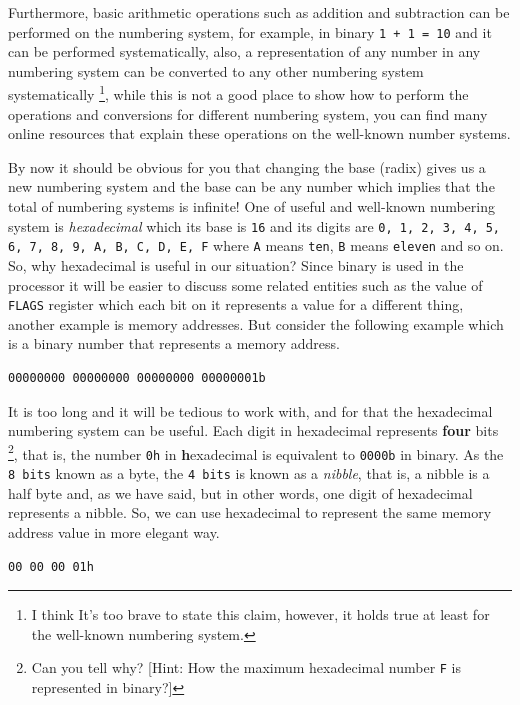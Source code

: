 Furthermore, basic arithmetic operations such as addition and
subtraction can be performed on the numbering system, for example, in
binary \lstinline!1 + 1 = 10! and it can be performed systematically,
also, a representation of any number in any numbering system can be
converted to any other numbering system systematically \footnote{I think
  It's too brave to state this claim, however, it holds true at least
  for the well-known numbering system.}, while this is not a good place
to show how to perform the operations and conversions for different
numbering system, you can find many online resources that explain these
operations on the well-known number systems.

By now it should be obvious for you that changing the base (radix) gives
us a new numbering system and the base can be any number which implies
that the total of numbering systems is infinite! One of useful and
well-known numbering system is \emph{hexadecimal} which its base is
\lstinline!16! and its digits are
\lstinline!0, 1, 2, 3, 4, 5, 6, 7, 8, 9, A, B, C, D, E, F! where
\lstinline!A! means \lstinline!ten!, \lstinline!B! means
\lstinline!eleven! and so on. So, why hexadecimal is useful in our
situation? Since binary is used in the processor it will be easier to
discuss some related entities such as the value of \lstinline!FLAGS!
register which each bit on it represents a value for a different thing,
another example is memory addresses. But consider the following example
which is a binary number that represents a memory address.

\begin{lstlisting}
00000000 00000000 00000000 00000001b
\end{lstlisting}

It is too long and it will be tedious to work with, and for that the
hexadecimal numbering system can be useful. Each digit in hexadecimal
represents \textbf{four} bits \footnote{Can you tell why? {[}Hint: How
  the maximum hexadecimal number \lstinline!F! is represented in
  binary?{]}}, that is, the number \lstinline!0h! in
\textbf{h}exadecimal is equivalent to \lstinline!0000b! in binary. As
the \lstinline!8 bits! known as a byte, the \lstinline!4 bits! is known
as a \emph{nibble}, that is, a nibble is a half byte and, as we have
said, but in other words, one digit of hexadecimal represents a nibble.
So, we can use hexadecimal to represent the same memory address value in
more elegant way.

\begin{lstlisting}
00 00 00 01h
\end{lstlisting}

